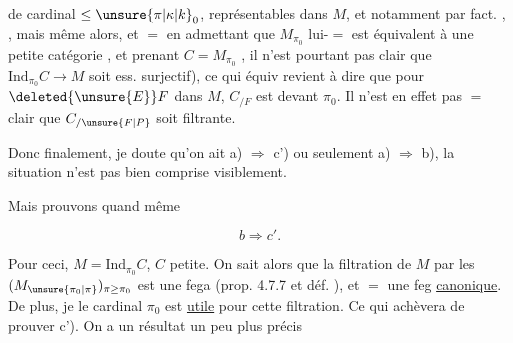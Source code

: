 de cardinal $\leq\unsure{\pi|\kappa|k}_0$, représentables dans $M$, et notamment par fact. , , mais même alors, et $=$ en admettant que $M_{\pi_0}$ lui-$=$\unsure{!} est équivalent à une petite catégorie\deleted{\unsure{)}} , et prenant $C=M_{\pi_0}$\deleted{\unsure{)}} , il n'est pourtant pas clair que   $\mathrm{Ind}_{\pi_0} C\longrightarrow M$ soit ess. surjectif), ce qui équiv revient à dire que pour  $\deleted{\unsure{E}}F$ dans $M$, $C_{/F}$ est  devant $\pi_0$. Il n'est en effet pas $=$ clair que $C_{/\unsure{F|P}}$ soit filtrante.

Donc finalement, je doute qu'on ait a) $\Longrightarrow$ c') ou seulement a) $\Longrightarrow$ b), la situation n'est pas bien comprise visiblement.

Mais prouvons quand même

\[ b\Longrightarrow c'. \]

Pour ceci,   $M=\mathrm{Ind}_{\pi_0}C$, $C$ petite. On sait alors que la filtration de $M$ par les $(M_{\unsure{\pi_0|\pi}})_{\pi\geq\pi_0}$ est une  fega (prop. 4.7.7 et déf. ), et $=$ une feg \uline{canonique}. De plus, je  le cardinal $\pi_0$ est \uline{utile}  pour cette filtration. Ce qui achèvera de prouver c').  On a un résultat un peu plus précis\unsure{:}
